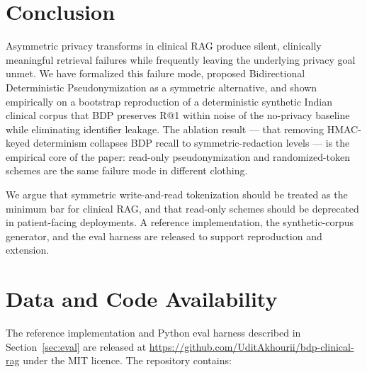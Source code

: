 \documentclass[11pt,a4paper]{article}
\begin{document}
\section{Conclusion}

Asymmetric privacy transforms in clinical RAG produce silent,
clinically meaningful retrieval failures while frequently leaving the
underlying privacy goal unmet. We have formalized this failure mode,
proposed Bidirectional Deterministic Pseudonymization as a symmetric
alternative, and shown empirically on a bootstrap reproduction of a
deterministic synthetic Indian clinical corpus that BDP preserves R@1
within noise of the no-privacy baseline while eliminating identifier
leakage. The ablation result --- that removing HMAC-keyed determinism
collapses BDP recall to symmetric-redaction levels --- is the empirical
core of the paper: read-only pseudonymization and randomized-token schemes
are the same failure mode in different clothing.

We argue that symmetric write-and-read tokenization should be treated as
the minimum bar for clinical RAG, and that read-only schemes should be
deprecated in patient-facing deployments. A reference implementation, the
synthetic-corpus generator, and the eval harness are released to support
reproduction and extension.

\section*{Data and Code Availability}

The reference implementation and Python eval harness described in
Section~\ref{sec:eval} are released at
\url{https://github.com/UditAkhourii/bdp-clinical-rag} under the MIT
licence. The repository contains:
\end{document}
